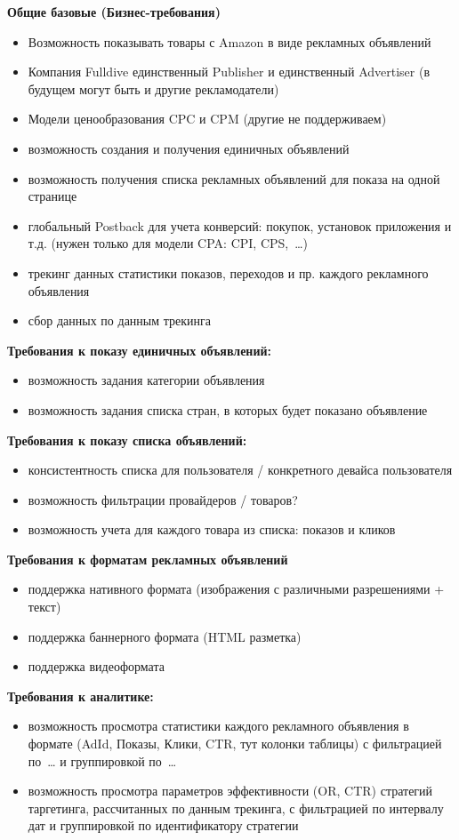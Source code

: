 \documentclass[times]{itmo-student-thesis}
\begin{document}
\textbf{Общие базовые (Бизнес-требования)}
\begin{itemize}
	\item Возможность показывать товары с Amazon в виде рекламных объявлений
	\item Компания Fulldive единственный Publisher и единственный Advertiser (в будущем могут быть и другие рекламодатели)
	\item Модели ценообразования CPC и CPM (другие не поддерживаем)
	\item возможность создания и получения единичных объявлений
	\item возможность получения списка рекламных объявлений для показа на одной странице
	\item глобальный Postback для учета конверсий: покупок, установок приложения и т.д. (нужен только для модели CPA: CPI, CPS, …)
	\item трекинг данных статистики показов, переходов и пр. каждого рекламного объявления
	\item сбор данных по данным трекинга
\end{itemize}

\textbf{Требования к показу единичных объявлений:}
\begin{itemize}
	\item возможность задания категории объявления
	\item возможность задания списка стран, в которых будет показано объявление
\end{itemize}

\textbf{Требования к показу списка объявлений:}
\begin{itemize}
	\item консистентность списка для пользователя / конкретного девайса пользователя
	\item возможность фильтрации провайдеров / товаров?
	\item возможность учета для каждого товара из списка: показов и кликов
\end{itemize}

\textbf{Требования к форматам рекламных объявлений}
\begin{itemize}
	\item поддержка нативного формата (изображения с различными разрешениями + текст)
	\item поддержка баннерного формата (HTML разметка)
	\item поддержка видеоформата
\end{itemize}

\textbf{Требования к аналитике:}
\begin{itemize}
	\item возможность просмотра статистики каждого рекламного объявления в формате (AdId, Показы, Клики, CTR, тут колонки таблицы) с фильтрацией по … и группировкой по …
	\item возможность просмотра параметров эффективности (OR, CTR) стратегий таргетинга, рассчитанных по данным трекинга, с фильтрацией по интервалу дат и группировкой по идентификатору стратегии
\end{itemize}
\end{document}
